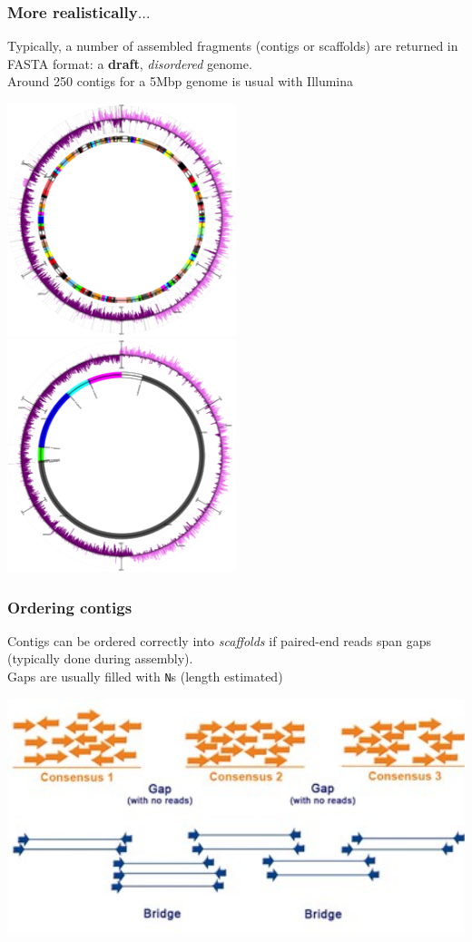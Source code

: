\begin{frame}
  \frametitle{More realistically$\ldots$}
  Typically, a number of assembled fragments (contigs or scaffolds) are returned in FASTA format: a \textbf{draft}, \textit{disordered} genome.\\
  Around 250 contigs for a 5Mbp genome is usual with Illumina\\
  \begin{center}
    \includegraphics[width=0.5\textwidth]{images/circle_1}
    \includegraphics[width=0.5\textwidth]{images/circle_3}
  \end{center}    
\end{frame}

\begin{frame}
  \frametitle{Ordering contigs}
  Contigs can be ordered correctly into \textit{scaffolds} if paired-end reads span gaps (typically done during assembly).\\
  Gaps are usually filled with \texttt{N}s (length estimated)
  \begin{center}
    \includegraphics[width=1\textwidth]{images/contig_order_pe}
  \end{center}    
\end{frame}


